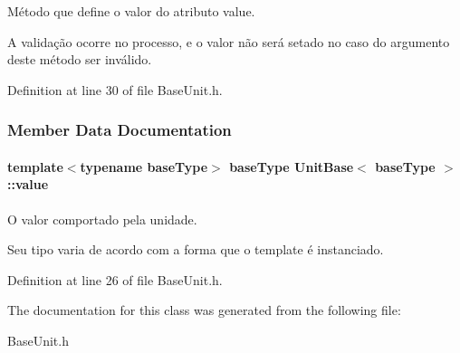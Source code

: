 Método que define o valor do atributo value. 

A validação ocorre no processo, e o valor não será setado no caso do argumento deste método ser inválido. 

Definition at line 30 of file Base\-Unit.\-h.



\subsubsection{Member Data Documentation}
\hypertarget{classUnitBase_a1c1ad08b45f07a94e5cf71dee734436b}{
\paragraph[{value}]{\setlength{\rightskip}{0pt plus 5cm}template$<$typename base\-Type$>$ base\-Type {\bf Unit\-Base}$<$ base\-Type $>$\-::value\hspace{0.3cm}{\ttfamily [protected]}}}\label{d5/db5/classUnitBase_a1c1ad08b45f07a94e5cf71dee734436b}


O valor comportado pela unidade. 

Seu tipo varia de acordo com a forma que o template é instanciado. 

Definition at line 26 of file Base\-Unit.\-h.



The documentation for this class was generated from the following file\-:\begin{DoxyCompactItemize}
\item 
Base\-Unit.\-h\end{DoxyCompactItemize}
